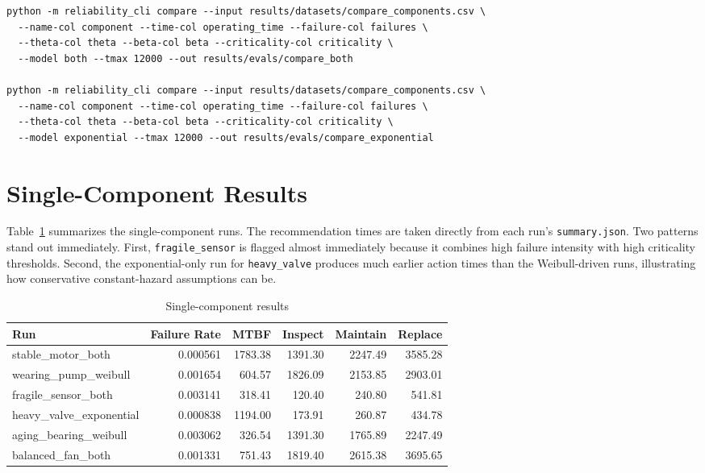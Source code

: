\documentclass[11pt]{article}
\begin{document}
\begin{verbatim}
python -m reliability_cli compare --input results/datasets/compare_components.csv \
  --name-col component --time-col operating_time --failure-col failures \
  --theta-col theta --beta-col beta --criticality-col criticality \
  --model both --tmax 12000 --out results/evals/compare_both

python -m reliability_cli compare --input results/datasets/compare_components.csv \
  --name-col component --time-col operating_time --failure-col failures \
  --theta-col theta --beta-col beta --criticality-col criticality \
  --model exponential --tmax 12000 --out results/evals/compare_exponential
\end{verbatim}

\section{Single-Component Results}
Table~\ref{tab:single_results} summarizes the single-component runs. The recommendation times are taken directly from each run's \texttt{summary.json}. Two patterns stand out immediately. First, \texttt{fragile\_sensor} is flagged almost immediately because it combines high failure intensity with high criticality thresholds. Second, the exponential-only run for \texttt{heavy\_valve} produces much earlier action times than the Weibull-driven runs, illustrating how conservative constant-hazard assumptions can be.

\begin{table}[H]
\centering
\caption{Single-component results}
\label{tab:single_results}
\begin{tabular}{lrrrrr}
\toprule
Run & Failure Rate & MTBF & Inspect & Maintain & Replace \\
\midrule
stable\_motor\_both & 0.000561 & 1783.38 & 1391.30 & 2247.49 & 3585.28 \\
wearing\_pump\_weibull & 0.001654 & 604.57 & 1826.09 & 2153.85 & 2903.01 \\
fragile\_sensor\_both & 0.003141 & 318.41 & 120.40 & 240.80 & 541.81 \\
heavy\_valve\_exponential & 0.000838 & 1194.00 & 173.91 & 260.87 & 434.78 \\
aging\_bearing\_weibull & 0.003062 & 326.54 & 1391.30 & 1765.89 & 2247.49 \\
balanced\_fan\_both & 0.001331 & 751.43 & 1819.40 & 2615.38 & 3695.65 \\
\bottomrule
\end{tabular}
\end{table}
\end{document}
